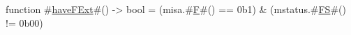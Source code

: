 function #\hyperref[sailRISCVzhaveFExt]{haveFExt}#()    -> bool = (misa.#\hyperref[sailRISCVzF]{F}#() == 0b1) & (mstatus.#\hyperref[sailRISCVzFS]{FS}#() != 0b00)

